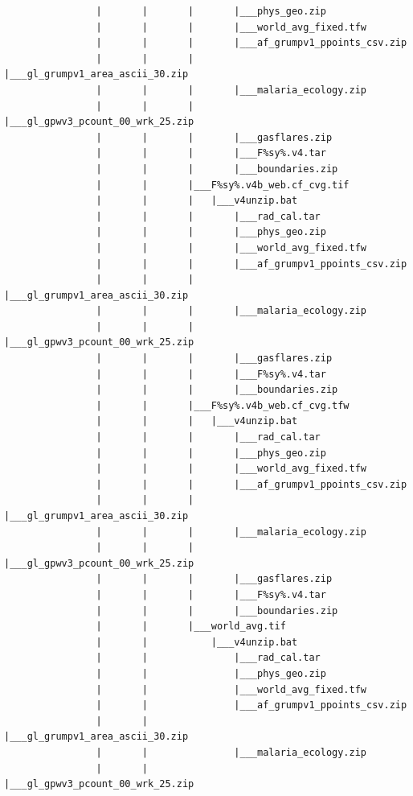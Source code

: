 \documentclass[]{book}
\begin{document}
\begin{verbatim}
                |       |       |       |___phys_geo.zip
                |       |       |       |___world_avg_fixed.tfw
                |       |       |       |___af_grumpv1_ppoints_csv.zip
                |       |       |       |___gl_grumpv1_area_ascii_30.zip
                |       |       |       |___malaria_ecology.zip
                |       |       |       |___gl_gpwv3_pcount_00_wrk_25.zip
                |       |       |       |___gasflares.zip
                |       |       |       |___F%sy%.v4.tar
                |       |       |       |___boundaries.zip
                |       |       |___F%sy%.v4b_web.cf_cvg.tif
                |       |       |   |___v4unzip.bat
                |       |       |       |___rad_cal.tar
                |       |       |       |___phys_geo.zip
                |       |       |       |___world_avg_fixed.tfw
                |       |       |       |___af_grumpv1_ppoints_csv.zip
                |       |       |       |___gl_grumpv1_area_ascii_30.zip
                |       |       |       |___malaria_ecology.zip
                |       |       |       |___gl_gpwv3_pcount_00_wrk_25.zip
                |       |       |       |___gasflares.zip
                |       |       |       |___F%sy%.v4.tar
                |       |       |       |___boundaries.zip
                |       |       |___F%sy%.v4b_web.cf_cvg.tfw
                |       |       |   |___v4unzip.bat
                |       |       |       |___rad_cal.tar
                |       |       |       |___phys_geo.zip
                |       |       |       |___world_avg_fixed.tfw
                |       |       |       |___af_grumpv1_ppoints_csv.zip
                |       |       |       |___gl_grumpv1_area_ascii_30.zip
                |       |       |       |___malaria_ecology.zip
                |       |       |       |___gl_gpwv3_pcount_00_wrk_25.zip
                |       |       |       |___gasflares.zip
                |       |       |       |___F%sy%.v4.tar
                |       |       |       |___boundaries.zip
                |       |       |___world_avg.tif
                |       |           |___v4unzip.bat
                |       |               |___rad_cal.tar
                |       |               |___phys_geo.zip
                |       |               |___world_avg_fixed.tfw
                |       |               |___af_grumpv1_ppoints_csv.zip
                |       |               |___gl_grumpv1_area_ascii_30.zip
                |       |               |___malaria_ecology.zip
                |       |               |___gl_gpwv3_pcount_00_wrk_25.zip

\end{verbatim}
\end{document}

